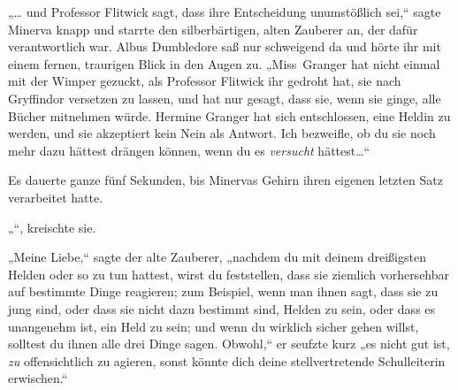
„… und Professor Flitwick sagt, dass ihre Entscheidung unumstößlich sei,“ sagte Minerva knapp und starrte den silberbärtigen, alten Zauberer an, der dafür verantwortlich war. Albus Dumbledore saß nur schweigend da und hörte ihr mit einem fernen, traurigen Blick in den Augen zu. „Miss~Granger hat nicht einmal mit der Wimper gezuckt, als Professor Flitwick ihr gedroht hat, sie nach Gryffindor versetzen zu lassen, und hat nur gesagt, dass sie, wenn sie ginge, alle Bücher mitnehmen würde. Hermine Granger hat sich entschlossen, eine Heldin zu werden, und sie akzeptiert kein Nein als Antwort. Ich bezweifle, ob du sie noch mehr dazu hättest drängen können, wenn du es \emph{versucht} hättest…“

Es dauerte ganze fünf Sekunden, bis Minervas Gehirn ihren eigenen letzten Satz verarbeitet hatte.

„“, kreischte sie.

„Meine Liebe,“ sagte der alte Zauberer, „nachdem du mit deinem dreißigsten Helden oder so zu tun hattest, wirst du feststellen, dass sie ziemlich vorhersehbar auf bestimmte Dinge reagieren; zum Beispiel, wenn man ihnen sagt, dass sie zu jung sind, oder dass sie nicht dazu bestimmt sind, Helden zu sein, oder dass es unangenehm ist, ein Held zu sein; und wenn du wirklich sicher gehen willst, solltest du ihnen alle drei Dinge sagen. Obwohl,“ er seufzte kurz „es nicht gut ist, \emph{zu} offensichtlich zu agieren, sonst könnte dich deine stellvertretende Schulleiterin erwischen.“

